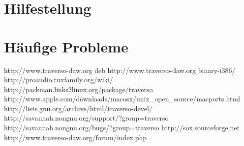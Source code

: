 \documentclass[a4paper,
               12pt,
               pdftex,
               twoside,
               smallheadings,
               headsepline,
               headinclude,
               DIV16,
               BCOR10mm,
               halfparskip
               ]{scrreprt}
\begin{document}
\chapter{Hilfestellung\label{sect_help}}

\chapter{Häufige Probleme}


\begin{thebibliography}{xx}
   http://www.traverso-daw.org
   deb http://www.traverso-daw.org binary-i386/
   http://proaudio.tuxfamily.org/wiki/
   http://packman.links2linux.org/package/traverso
   http://www.apple.com/downloads/macosx/unix\_open\_source/macports.html
   http://lists.gnu.org/archive/html/traverso-devel/
   http://savannah.nongnu.org/support/?group=traverso
   http://savannah.nongnu.org/bugs/?group=traverso
   http://sox.sourceforge.net
   http://www.traverso-daw.org/forum/index.php
\end{thebibliography}
\end{document}
